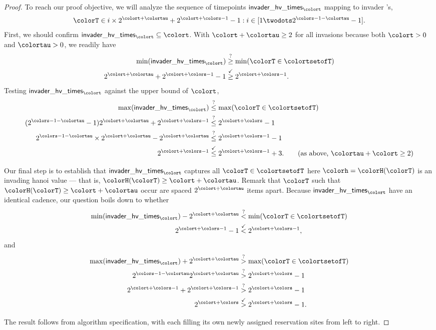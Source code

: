 \begin{proof}
To reach our proof objective, we will analyze the sequence of timepoints $\mathsf{invader\_hv\_times}_{\colort}$ mapping to invader \hv{}'s,
\begin{align*}
\colorT \in i \times 2^{\colort + \colortau} +
2^{\colort + \colors - 1} - 1
:
i \in [1 \twodots 2^{\colors - 1 - \colortau} - 1].
\end{align*}
First, we should confirm $\mathsf{invader\_hv\_times}_{\colort} \subseteq \colort$.
With $\colort + \colortau \geq 2$ for all invasions because both $\colort > 0$ and $\colortau > 0$, we readily have
\begin{align*}
\min(\mathsf{invader\_hv\_times}_{\colort})
&\stackrel{?}{\geq}
\min(\colorT \in \colortsetofT)\\
2^{\colort + \colortau} + 2^{\colort + \colors - 1} - 1
&\stackrel{\checkmark}{\geq}
2^{\colort + \colors - 1}.
\end{align*}
Testing $\mathsf{invader\_hv\_times}_{\colort}$ against the upper bound of $\colort$,
\begin{align*}
\max(\mathsf{invader\_hv\_times}_{\colort})
&\stackrel{?}{\leq}
\max(\colorT \in \colortsetofT)
\\
(2^{\colors - 1 - \colortau}  - 1)
2^{\colort + \colortau} + 2^{\colort + \colors - 1}
&\stackrel{?}{\leq}
2^{\colort + \colors} - 1
\\
2^{\colors - 1 - \colortau} \times 2^{\colort + \colortau} - 2^{\colort + \colortau}
&\stackrel{?}{\leq}
2^{\colort + \colors - 1} - 1
\\
2^{\colort + \colors - 1}
&\stackrel{\checkmark}{\leq}
2^{\colort + \colors - 1} + 3.
\tag{as above, $\colortau + \colort \geq 2$}
\end{align*}

Our final step is to establish that $\mathsf{invader\_hv\_times}_{\colort}$ captures all $\colorT \in \colortsetofT$ here $\colorh = \colorH(\colorT)$ is an invading hanoi value --- that is, $\colorH(\colorT) \geq \colort + \colortau$.
Remark that $\colorT$ such that $\colorH(\colorT) \geq \colort + \colortau$ occur are spaced $2^{\colort + \colortau}$ items apart.
Because $\mathsf{invader\_hv\_times}_{\colort}$ have an identical cadence, our question boils down to whether
\begin{align*}
\min(\mathsf{invader\_hv\_times}_{\colort})
- 2^{\colort + \colortau}
&\stackrel{?}{<}
\min(\colorT \in \colortsetofT)\\
2^{\colort + \colors - 1} - 1
&\stackrel{\checkmark}{<}
2^{\colort + \colors - 1},
\end{align*}
and
\begin{align*}
\max(\mathsf{invader\_hv\_times}_{\colort})
+ 2^{\colort + \colortau}
&\stackrel{?}{>}
\max(\colorT \in \colortsetofT)\\
2^{\colors - 1 - \colortau} 2^{\colort + \colortau}
&\stackrel{?}{>}
2^{\colort + \colors} - 1\\
2^{\colort + \colors - 1}
+ 2^{\colort + \colors - 1}
&\stackrel{?}{>}
2^{\colort + \colors} - 1\\
2^{\colort + \colors}
&\stackrel{\checkmark}{>}
2^{\colort + \colors} - 1.
\end{align*}

The result follows from algorithm specification, with each \hv{} filling its own newly assigned reservation sites from left to right.
\end{proof}
